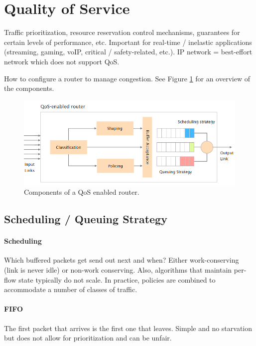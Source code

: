 \section{Quality of Service}

Traffic prioritization, resource reservation control mechanisms, guarantees for certain levels of performance, etc. Important for real-time / inelastic applications (streaming, gaming, voIP, critical / safety-related, etc.). IP network = best-effort network which does not support QoS.

How to configure a router to manage congestion. See Figure \ref{fig:qos} for an overview of the components.

\begin{figure}[h]
	\centering
	\includegraphics[scale=0.7]{images/2-qos.PNG}
	\caption{Components of a QoS enabled router.}
	\label{fig:qos}
\end{figure}

\subsection{Scheduling / Queuing Strategy}


\paragraph{Scheduling}
Which buffered packets get send out next and when? Either work-conserving (link is never idle) or non-work conserving. Also, algorithms that maintain per-flow state typically do not scale. In practice, policies are combined to accommodate a number of classes of traffic.

\paragraph{FIFO} The first packet that arrives is the first one that leaves. Simple and no starvation but does not allow for prioritization and can be unfair.

